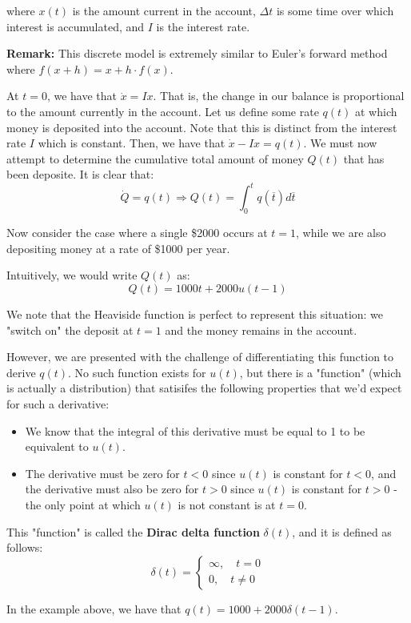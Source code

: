 where $x(t)$ is the amount current in the account, $\Delta t$ is some time over which interest is accumulated, and $I$ is the interest rate.

\textbf{Remark:} This discrete model is extremely similar to Euler's forward method where $f(x + h) = x + h \cdot f(x)$.

At $t = 0$, we have that $\dot{x} = Ix$. That is, the change in our balance is proportional to the amount currently in the account.
Let us define some rate $q(t)$ at which money is deposited into the account. Note that this is distinct from the interest rate $I$ which is constant. Then, we have that $\dot{x} - Ix = q(t)$.  We must now attempt to determine the cumulative total amount of money $Q(t)$ that has been deposite. It is clear that:
\[
\dot{Q} = q(t) \Longrightarrow Q(t) = \int_{0}^{t} q(\overline{t}) d\overline{t}
\]

Now consider the case where a single \$2000 occurs at $t = 1$, while we are also depositing money at a rate of \$1000 per year. 

Intuitively, we would write $Q(t)$ as:
\[
Q(t) = 1000t + 2000u(t - 1)
\]

We note that the Heaviside function is perfect to represent this situation: we "switch on" the deposit at $t = 1$ and the money remains in the account.

However, we are presented with the challenge of differentiating this function to derive $q(t)$. No such function exists for $u(t)$, but there is a "function" (which is actually a distribution) that satisifes the following properties that we'd expect for such a derivative:
\begin{itemize}
\item We know that the integral of this derivative must be equal to 1 to be equivalent to $u(t)$.
\item The derivative must be zero for $t < 0$ since $u(t)$ is constant for $t < 0$, and the derivative must also be zero for $t > 0$ since $u(t)$ is constant for $t > 0$ - the only point at which $u(t)$ is not constant is at $t = 0$.
\end{itemize}

This "function" is called the \textbf{Dirac delta function} $\delta(t)$, and it is defined as follows:
\[
\delta(t) =
\begin{cases}
\infty, \quad t = 0 \\
0, \quad t \neq 0
\end{cases}
\]

In the example above, we have that $q(t) = 1000 + 2000\delta(t - 1)$.

